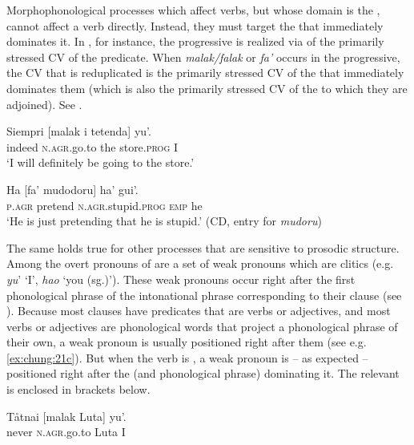 \documentclass[output=paper,
modfonts
]{LSP/langsci}
\begin{document}
\begin{exe}
\begin{xlist}
Morphophonological processes which affect verbs, but whose domain is the
, cannot affect a  verb directly.
Instead, they must target the  that immediately
dominates it. In , for instance, the progressive  is
realized via  of the primarily stressed CV of the
predicate. When \emph{malak/falak} or \emph{fa'} occurs in the
progressive, the CV that is reduplicated is the primarily stressed CV of
the  that immediately dominates them (which is also the
primarily stressed CV of the  to which they are
adjoined). See .

\ea \label{ex:chung:24}
\ea \label{ex:chung:24a}
\gll  Siempri {[}malak i tetenda{]} yu'.\\
indeed \textsc{n.agr.}go.to the store.\textsc{prog} I\\
\glt `I will definitely be going to the store.'

\ex \label{ex:chung:24b} \gll  Ha {[}fa' mudodoru{]} ha' gui'.\\
\textsc{p.agr} pretend \textsc{n.agr.}stupid.\textsc{prog} \textsc{emp} he\\
\glt `He is just pretending that he is stupid.' (CD, entry for \emph{mudoru})
\z
\z

The same holds true for other processes that are sensitive to prosodic
structure. Among the overt pronouns of  are a set of weak
pronouns which are  clitics (e.g. \emph{yu}' `I',
\emph{hao} `you (sg.)'). These weak pronouns occur right after the first
phonological phrase of the intonational phrase corresponding to their
clause (see \citealt{chung2003}). Because most  clauses have predicates
that are verbs or adjectives, and most verbs or adjectives are
phonological words that project a phonological phrase of their own, a
weak pronoun is usually positioned right after them (see e.g. \ref{ex:chung:21c}).
But when the verb is , a weak pronoun is -- as
expected -- positioned right after the  (and
phonological phrase) dominating it. The relevant  is
enclosed in brackets below.

\ea \label{ex:chung:25}
\ea \label{ex:chung:25a}
\gll Tåtnai {[}malak Luta{]} yu'.\\
never \textsc{n.agr.}go.to Luta I\\


\end{xlist}
\end{exe}
\end{document}
